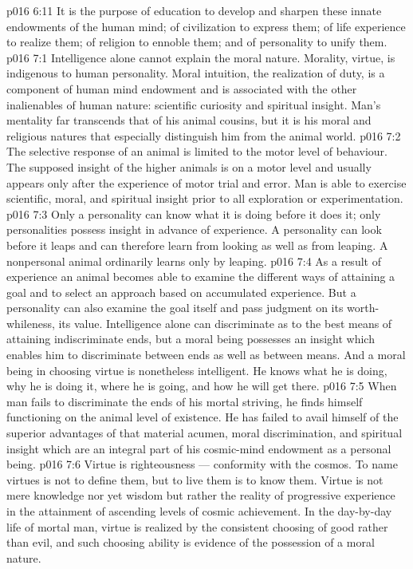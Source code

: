 \vs p016 6:11 It is the purpose of education to develop and sharpen these innate endowments of the human mind; of civilization to express them; of life experience to realize them; of religion to ennoble them; and of personality to unify them.
\vs p016 7:1 Intelligence alone cannot explain the moral nature. Morality, virtue, is indigenous to human personality. Moral intuition, the realization of duty, is a component of human mind endowment and is associated with the other inalienables of human nature: scientific curiosity and spiritual insight. Man’s mentality far transcends that of his animal cousins, but it is his moral and religious natures that especially distinguish him from the animal world.
\vs p016 7:2 The selective response of an animal is limited to the motor level of behaviour. The supposed insight of the higher animals is on a motor level and usually appears only after the experience of motor trial and error. Man is able to exercise scientific, moral, and spiritual insight prior to all exploration or experimentation.
\vs p016 7:3 Only a personality can know what it is doing before it does it; only personalities possess insight in advance of experience. A personality can look before it leaps and can therefore learn from looking as well as from leaping. A nonpersonal animal ordinarily learns only by leaping.
\vs p016 7:4 As a result of experience an animal becomes able to examine the different ways of attaining a goal and to select an approach based on accumulated experience. But a personality can also examine the goal itself and pass judgment on its worth\hyp{}whileness, its value. Intelligence alone can discriminate as to the best means of attaining indiscriminate ends, but a moral being possesses an insight which enables him to discriminate between ends as well as between means. And a moral being in choosing virtue is nonetheless intelligent. He knows what he is doing, why he is doing it, where he is going, and how he will get there.
\vs p016 7:5 When man fails to discriminate the ends of his mortal striving, he finds himself functioning on the animal level of existence. He has failed to avail himself of the superior advantages of that material acumen, moral discrimination, and spiritual insight which are an integral part of his cosmic\hyp{}mind endowment as a personal being.
\vs p016 7:6 \pc Virtue is righteousness --- conformity with the cosmos. To name virtues is not to define them, but to live them is to know them. Virtue is not mere knowledge nor yet wisdom but rather the reality of progressive experience in the attainment of ascending levels of cosmic achievement. In the day\hyp{}by\hyp{}day life of mortal man, virtue is realized by the consistent choosing of good rather than evil, and such choosing ability is evidence of the possession of a moral nature.
